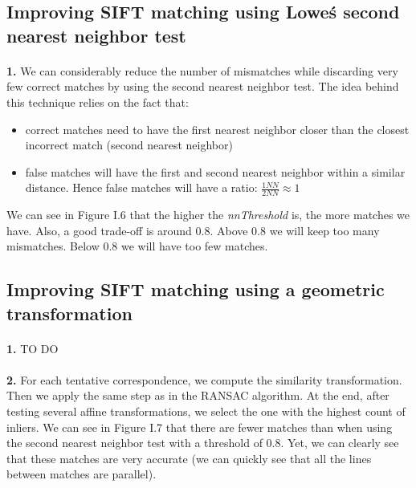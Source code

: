 \documentclass[11pt]{article}
\numberwithin{figure}{section} %
\begin{document}
\subsection{Improving SIFT matching using Lowe\'s second nearest neighbor test}

\paragraph{}\textbf{1.} We can considerably reduce the number of mismatches while discarding very few correct matches by using the second nearest neighbor test. The idea behind this technique relies on the fact that:
\begin{itemize}
\item correct matches need to have the first nearest neighbor closer than the closest incorrect match (second nearest neighbor)
\item false matches will have the first and second nearest neighbor within a similar distance. Hence false matches will have a ratio: $\frac{1NN}{2NN} \approx 1$
\end{itemize}

We can see in Figure I.6 that the higher the \textit{nnThreshold} is, the more matches we have. Also, a good trade-off is around 0.8. Above 0.8 we will keep too many mismatches. Below 0.8 we will have too few matches.

\subsection{Improving SIFT matching using a geometric transformation}

\paragraph{}\textbf{1.} TO DO

\paragraph{}\textbf{2.} For each tentative correspondence, we compute the similarity transformation. Then we apply the same step as in the RANSAC algorithm. At the end, after testing several affine transformations, we select the one with the highest count of inliers. \newline
We can see in Figure I.7 that there are fewer matches than when using the second nearest neighbor test with a threshold of 0.8. Yet, we can clearly see that these matches are very accurate (we can quickly see that all the lines between matches are parallel).
\end{document}
